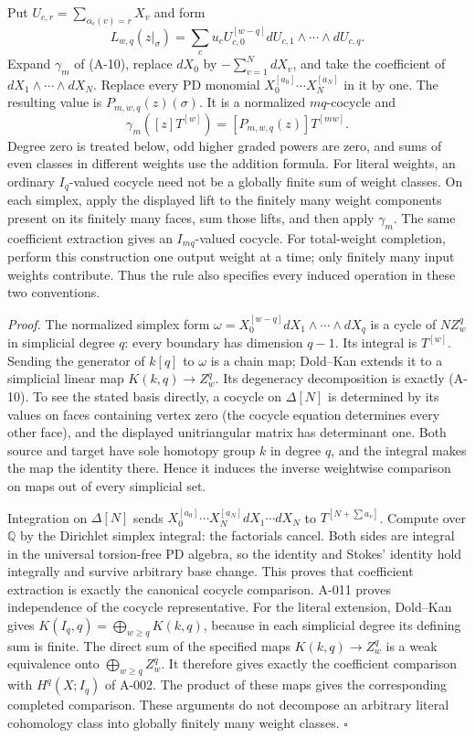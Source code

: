 Put $U_{c,r}=\sum_{\alpha_c(v)=r}X_v$ and form
\[
 L_{w,q}(z|_\sigma)=\sum_c u_c U_{c,0}^{[w-q]}
                           dU_{c,1}\wedge\cdots\wedge dU_{c,q}.
 \tag{A-10}
\]
Expand $\gamma_m$ of (A-10), replace $dX_0$ by
$-\sum_{v=1}^N dX_v$, and take the coefficient of
$dX_1\wedge\cdots\wedge dX_N$. Replace every PD monomial
$X_0^{[a_0]}\cdots X_N^{[a_N]}$ in it by one. The resulting value
is $P_{m,w,q}(z)(\sigma)$. It is a normalized $mq$-cocycle and
\[
 \gamma_m([z]T^{[w]})=[P_{m,w,q}(z)]T^{[mw]}.
 \tag{A-11}
\]
Degree zero is treated below, odd higher graded powers are zero,
and sums of even classes in different weights use the addition
formula. For literal weights, an ordinary $I_q$-valued cocycle need
not be a globally finite sum of weight classes. On each simplex,
apply the displayed lift to the finitely many weight components
present on its finitely many faces, sum those lifts, and then apply
$\gamma_m$. The same coefficient extraction gives an
$I_{mq}$-valued cocycle. For total-weight completion, perform this
construction one output weight at a time; only finitely many input
weights contribute. Thus the rule also specifies every induced
operation in these two conventions.

\emph{Proof.}
The normalized simplex form
$\omega=X_0^{[w-q]}dX_1\wedge\cdots\wedge dX_q$ is a cycle
of $NZ_w^q$ in simplicial degree $q$: every boundary has dimension
$q-1$. Its integral is $T^{[w]}$. Sending the generator of $k[q]$
to $\omega$ is a chain map; Dold--Kan extends it to a simplicial
linear map $K(k,q)\to Z_w^q$. Its degeneracy decomposition is
exactly (A-10). To see the stated basis directly, a cocycle on
$\Delta[N]$ is determined by its values on faces containing vertex
zero (the cocycle equation determines every other face), and the
displayed unitriangular matrix has determinant one. Both source
and target have sole homotopy group $k$ in degree $q$, and the
integral makes the map the identity there. Hence it induces the
inverse weightwise comparison on maps out of every simplicial set.

Integration on $\Delta[N]$ sends
$X_0^{[a_0]}\cdots X_N^{[a_N]}dX_1\cdots dX_N$ to
$T^{[N+\sum a_v]}$. Compute over $\mathbb Q$ by the Dirichlet
simplex integral: the factorials cancel. Both sides are integral in
the universal torsion-free PD algebra, so the identity and Stokes'
identity hold integrally and survive arbitrary base change. This
proves that coefficient extraction is exactly the canonical cocycle
comparison. A-011 proves independence of the cocycle representative. For the
literal extension, Dold--Kan gives
$K(I_q,q)=\bigoplus_{w\geq q}K(k,q)$, because in each simplicial
degree its defining sum is finite. The direct sum of the specified
maps $K(k,q)\to Z_w^q$ is a weak equivalence onto
$\bigoplus_{w\geq q}Z_w^q$. It therefore gives exactly the
coefficient comparison with $H^q(X;I_q)$ of A-002. The product of
these maps gives the corresponding completed comparison. These
arguments do not decompose an arbitrary literal cohomology class
into globally finitely many weight classes.
\hfill$\square$

